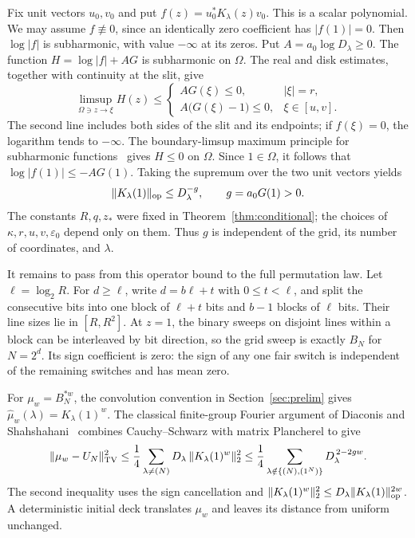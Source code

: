 Fix unit vectors \(u_0,v_0\) and put \(f(z)=u_0^*K_\lambda(z)v_0\). This is a scalar polynomial. We may assume \(f\not\equiv0\), since an identically zero coefficient has \(|f(1)|=0\). Then \(\log|f|\) is subharmonic, with value \(-\infty\) at its zeros. Put \(A=a_0\log D_\lambda\ge0\). The function \(H=\log|f|+AG\) is subharmonic on \(\Omega\). The real and disk estimates, together with continuity at the slit, give
\[
 \limsup_{\Omega\ni z\to\xi}H(z)\le
 \begin{cases}
   A G(\xi)\le0,&|\xi|=r,\\
   A\bigl(G(\xi)-1\bigr)\le0,&\xi\in[u,v].
 \end{cases}
\]
The second line includes both sides of the slit and its endpoints; if \(f(\xi)=0\), the logarithm tends to \(-\infty\). The boundary-limsup maximum principle for subharmonic functions~\cite[Chapter I, Section 4.C.1, Theorem (4.14)]{Demailly2012} gives \(H\le0\) on \(\Omega\). Since \(1\in\Omega\), it follows that \(\log|f(1)|\le-A G(1)\). Taking the supremum over the two unit vectors yields
\begin{equation}
 \|K_\lambda(1)\|_{\mathrm{op}}\le D_\lambda^{-g},
 \qquad g=a_0G(1)>0.
 \label{ac:eq:25}
\end{equation}
The constants \(R,q,z_*\) were fixed in Theorem~\ref{thm:conditional}; the choices of \(\kappa,r,u,v,\varepsilon_0\) depend only on them. Thus \(g\) is independent of the grid, its number of coordinates, and \(\lambda\).

It remains to pass from this operator bound to the full permutation law. Let \(\ell=\log_2R\). For \(d\ge\ell\), write \(d=b\ell+t\) with \(0\le t<\ell\), and split the consecutive bits into one block of \(\ell+t\) bits and \(b-1\) blocks of \(\ell\) bits. Their line sizes lie in \([R,R^2]\). At \(z=1\), the binary sweeps on disjoint lines within a block can be interleaved by bit direction, so the grid sweep is exactly \(B_N\) for \(N=2^d\). Its sign coefficient is zero: the sign of any one fair switch is independent of the remaining switches and has mean zero.

For \(\mu_w=B_N^{*w}\), the convolution convention in Section~\ref{sec:prelim} gives \(\widehat\mu_w(\lambda)=K_\lambda(1)^w\). The classical finite-group Fourier argument of Diaconis and Shahshahani~\cite[Section 2, Lemma 2, and the proof of Lemma 14]{DiaconisShahshahani1981} combines Cauchy--Schwarz with matrix Plancherel to give
\[
 \|\mu_w-U_N\|_{\mathrm{TV}}^2
 \le \frac14\sum_{\lambda\ne(N)}D_\lambda\,
                \|K_\lambda(1)^w\|_2^2
 \le \frac14\sum_{\lambda\notin\{(N),(1^N)\}}
                D_\lambda^{\,2-2gw}.
\]
The second inequality uses the sign cancellation and
\(\|K_\lambda(1)^w\|_2^2\le D_\lambda\|K_\lambda(1)\|_{\mathrm{op}}^{2w}\).
A deterministic initial deck translates \(\mu_w\) and leaves its distance from uniform unchanged.

